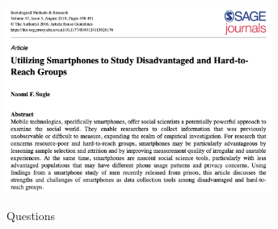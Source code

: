 \documentclass[aspectratio=169]{beamer}
\begin{document}
\begin{frame}

\begin{center}
\includegraphics[width=0.65\textwidth]{figures/sugie2016-abstract.png}
\end{center}

\vfill
{}


\end{frame}
\begin{frame}

\begin{center}
Questions
\end{center}

\end{frame}
\end{document}
